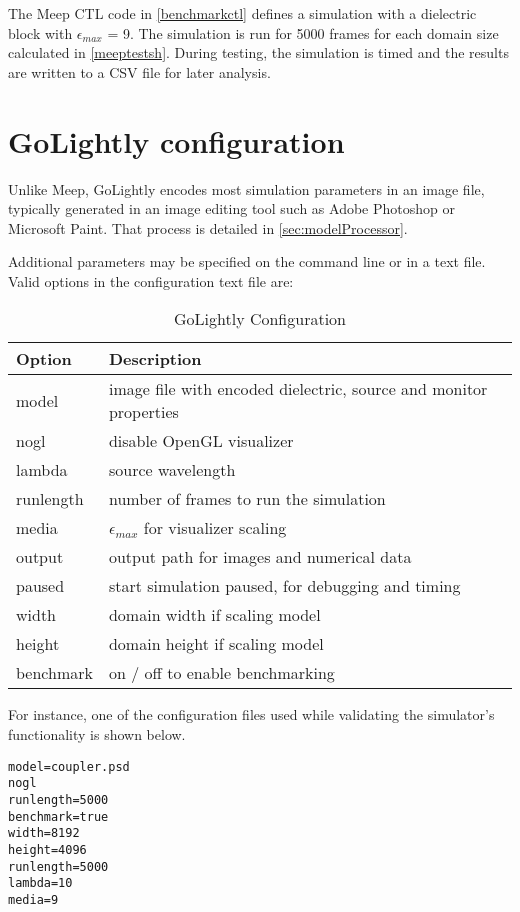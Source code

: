 


The Meep CTL code in \autoref{benchmarkctl} defines a simulation with a dielectric block with $\epsilon_{max}$ = 9. The simulation is run for 5000 frames for each domain size calculated in \autoref{meeptestsh}. During testing, the simulation is timed and the results are written to a CSV file for later analysis. 



\section{GoLightly configuration}

Unlike Meep, GoLightly encodes most simulation parameters in an image file, typically generated in an image editing tool such as Adobe Photoshop or Microsoft Paint. That process is detailed in \autoref{sec:modelProcessor}. 

Additional parameters may be specified on the command line or in a text file. Valid options in the configuration text file are:

\begin{table}[h!]
	\label{golightlyConfig}
	\centering
	\caption{GoLightly Configuration}
	\label{tab:golightlyConfigTerms}
	\begin{tabular}{l | l}
		Option	& Description \\
		\hline
			model     & image file with encoded dielectric, source and monitor properties \\
			nogl      & disable OpenGL visualizer										  \\
			lambda    & source wavelength												  \\
			runlength & number of frames to run the simulation							  \\
			media     & $\epsilon_{max}$  for visualizer scaling								  \\
			output    & output path for images and numerical data						  \\
			paused    & start simulation paused, for debugging and timing				  \\
			width     & domain width if scaling model									  \\
			height    & domain height if scaling model									  \\
			benchmark & on / off to enable benchmarking									  \\
	\end{tabular}
\end{table}

For instance, one of the configuration files used while validating the simulator's functionality is shown below.

\begin{lstlisting}[caption={Samply GoLightly Configuration File},label={listing:sampleGolightlyConfig}]
model=coupler.psd
nogl
runlength=5000
benchmark=true
width=8192
height=4096
runlength=5000
lambda=10
media=9
\end{lstlisting}




